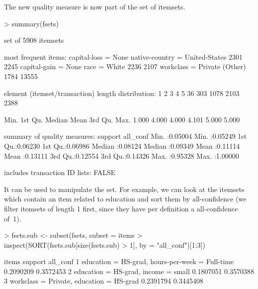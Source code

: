 \documentclass[10pt,a4paper]{article}
\begin{document}
\begin{Schunk}
\end{Schunk}

The new quality measure is now part of the set of itemsets.
\begin{Schunk}
\begin{Sinput}
> summary(fsets)
\end{Sinput}
\begin{Soutput}
set of 5908 itemsets

most frequent items:
           capital-loss = None native-country = United-States 
                          2301                           2245 
           capital-gain = None                   race = White 
                          2236                           2107 
           workclass = Private                        (Other) 
                          1784                          13555 

element (itemset/transaction) length distribution:
   1    2    3    4    5 
  36  303 1078 2103 2388 

   Min. 1st Qu.  Median    Mean 3rd Qu.    Max. 
  1.000   4.000   4.000   4.101   5.000   5.000 

summary of quality measures:
    support           all_conf      
 Min.   :0.05004   Min.   :0.05249  
 1st Qu.:0.06230   1st Qu.:0.06986  
 Median :0.08124   Median :0.09349  
 Mean   :0.11114   Mean   :0.13111  
 3rd Qu.:0.12554   3rd Qu.:0.14326  
 Max.   :0.95328   Max.   :1.00000  

includes transaction ID lists: FALSE 

\end{Soutput}
\end{Schunk}

It can be used to
manipulate the set. For example, we can look at the itemsets which contain an
item related to education and sort them by all-confidence (we filter itemsets
of length 1 first, since they have per definition a all-confidence of~1).

\begin{Schunk}
\begin{Sinput}
> fsets.sub <- subset(fsets, subset = items %
> inspect(SORT(fsets.sub[size(fsets.sub) > 1], by = "all_conf")[1:3])
\end{Sinput}
\begin{Soutput}
  items                          support  all_conf
1 {education = HS-grad,                           
   hours-per-week = Full-time} 0.2090209 0.3572453
2 {education = HS-grad,                           
   income = small}             0.1807051 0.3570388
3 {workclass = Private,                           
   education = HS-grad}        0.2391794 0.3445408

\end{Soutput}
\end{Schunk}
\end{document}
